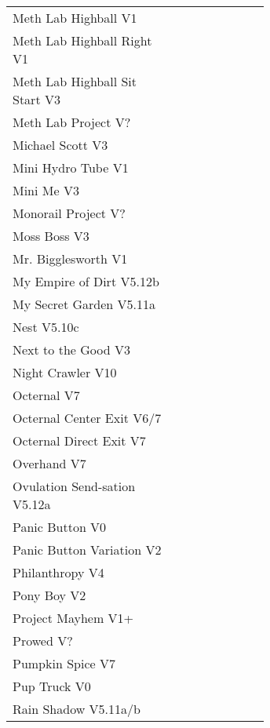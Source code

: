 \begin{flushleft}
\begin{center}
\begin{supertabular}{p{0.65\linewidth}r}
Meth Lab Highball V1 & \pageref{rt:Meth Lab Highball} \\
Meth Lab Highball Right V1 & \pageref{rt:Meth Lab Highball Right} \\
Meth Lab Highball Sit Start V3 & \pageref{vr:Meth Lab Highball Sit Start} \\
Meth Lab Project V? & \pageref{rt:Meth Lab Project} \\
Michael Scott V3 & \pageref{rt:Michael Scott} \\
Mini Hydro Tube V1 & \pageref{rt:Mini Hydro Tube} \\
Mini Me V3 & \pageref{rt:Mini Me} \\
Monorail Project V? & \pageref{rt:Monorail Project} \\
Moss Boss V3 & \pageref{rt:Moss Boss} \\
Mr. Bigglesworth V1 & \pageref{vr:Mr. Bigglesworth} \\
My Empire of Dirt V5.12b & \pageref{rt:My Empire of Dirt} \\
My Secret Garden V5.11a & \pageref{rt:My Secret Garden} \\
Nest V5.10c & \pageref{rt:Nest} \\
Next to the Good V3 & \pageref{rt:Next to the Good} \\
Night Crawler V10 & \pageref{rt:Night Crawler} \\
Octernal V7 & \pageref{rt:Octernal} \\
Octernal Center Exit V6/7 & \pageref{vr:Octernal Center Exit} \\
Octernal Direct Exit V7 & \pageref{vr:Octernal Direct Exit} \\
Overhand V7 & \pageref{rt:Overhand} \\
Ovulation Send-sation V5.12a & \pageref{rt:Ovulation Send-sation} \\
Panic Button V0 & \pageref{rt:Panic Button} \\
Panic Button Variation V2 & \pageref{vr:Panic Button Variation} \\
Philanthropy V4 & \pageref{rt:Philanthropy} \\
Pony Boy V2 & \pageref{rt:Pony Boy} \\
Project Mayhem V1+ & \pageref{rt:Project Mayhem} \\
Prowed V? & \pageref{vr:Prowed} \\
Pumpkin Spice V7 & \pageref{rt:Pumpkin Spice} \\
Pup Truck V0 & \pageref{rt:Pup Truck} \\
Rain Shadow V5.11a/b & \pageref{rt:Rain Shadow} \\

\end{supertabular}
\end{center}
\end{flushleft}
